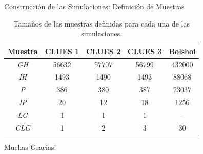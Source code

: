 \documentclass[8pt,fleqn]{beamer}
\begin{document}
\begin{frame}
\begin{block}{Construcción de las Simulaciones: Definición de Muestras}\justifying

\begin{table}[htbp]
\begin{small}
  \centering
  \begin{tabular}{| c | c | c | c | c |} \hline
	{\textbf{Muestra}}		& 
	{\textbf{CLUES 1}}		& 
	{\textbf{CLUES 2}} 		& 
	{\textbf{CLUES 3}}		& 
	{\textbf{Bolshoi}}		 \\ \hline
	\textit{GH} 	& 56632 & 57707 & 56799  & 432000 	\\
	\textit{IH}		& 1493 	& 1490 	& 1493	 & 88068 	\\
	\textit{P}		& 386 	& 380 	& 387	 & 23037 	\\
	\textit{IP}		& 20 	& 12 	& 18 	 & 1256 	\\
	\textit{LG}		& 1 	& 1 	& 1 	 & --		\\
	\textit{CLG}	& 1 	& 2 	& 3 	 & 30		\\ \hline
  \end{tabular}
  
  \caption{Tamaños de las muestras definidas para cada una de las 
  simulaciones. }  
  \label{tab:Samples}
\end{small}
\end{table}

\end{block}
\end{frame}


\begin{frame}
\begin{block}{}\justifying

\begin{huge}
\begin{center}
Muchas Gracias!
\end{center}
\end{huge}


\end{block}
\end{frame}
\end{document}

